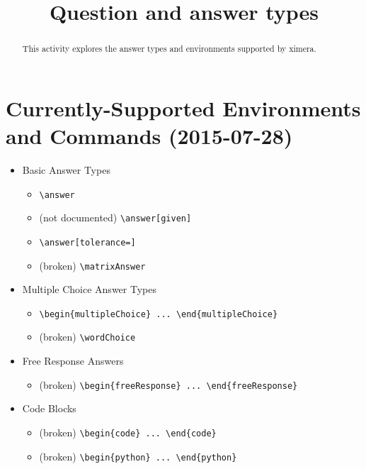 \documentclass{ximera}
\title{Question and answer types}
\begin{document}
\begin{abstract}
  This activity explores the answer types and environments supported by ximera.
\end{abstract}

\maketitle

\section{Currently-Supported Environments and Commands (2015-07-28)}

\begin{itemize}
\item Basic Answer Types
  \begin{itemize}
    \item \verb!\answer!
    \item (not documented) \verb!\answer[given]!
    \item \verb!\answer[tolerance=]!
    \item (broken) \verb!\matrixAnswer!    
  \end{itemize}
\item Multiple Choice Answer Types
  \begin{itemize}
    \item \verb!\begin{multipleChoice} ... \end{multipleChoice}!
    \item (broken) \verb!\wordChoice!
  \end{itemize}    
\item Free Response Answers
  \begin{itemize}   
    \item (broken) \verb!\begin{freeResponse} ... \end{freeResponse}!
  \end{itemize}
\item Code Blocks
  \begin{itemize}
    \item (broken) \verb!\begin{code} ... \end{code}!
    \item (broken) \verb!\begin{python} ... \end{python}!
  \end{itemize}

\end{itemize}
\end{document}

